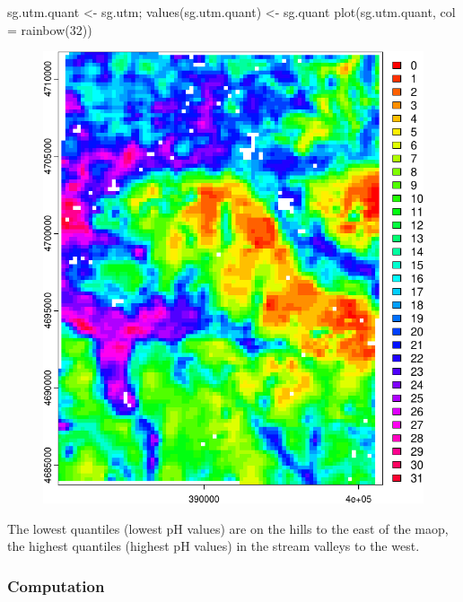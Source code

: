 \documentclass[
  letterpaper,
  DIV=11,
  numbers=noendperiod]{scrartcl}
\newenvironment{Shaded}{\begin{snugshade}}{\end{snugshade}}
\newcommand{\AttributeTok}[1]{\textcolor[rgb]{0.40,0.45,0.13}{#1}}
\newcommand{\DecValTok}[1]{\textcolor[rgb]{0.68,0.00,0.00}{#1}}
\newcommand{\FunctionTok}[1]{\textcolor[rgb]{0.28,0.35,0.67}{#1}}
\newcommand{\NormalTok}[1]{\textcolor[rgb]{0.00,0.23,0.31}{#1}}
\newcommand{\OtherTok}[1]{\textcolor[rgb]{0.00,0.23,0.31}{#1}}
\begin{document}
\begin{Shaded}
\begin{Highlighting}[]
\NormalTok{sg.utm.quant }\OtherTok{\textless{}{-}}\NormalTok{ sg.utm; }\FunctionTok{values}\NormalTok{(sg.utm.quant) }\OtherTok{\textless{}{-}}\NormalTok{ sg.quant}
\FunctionTok{plot}\NormalTok{(sg.utm.quant, }\AttributeTok{col =} \FunctionTok{rainbow}\NormalTok{(}\DecValTok{32}\NormalTok{))}
\end{Highlighting}
\end{Shaded}

\begin{figure}[H]

{\centering \includegraphics{PatternAnalysisWorkshopTutorial_files/figure-pdf/cut.matrix-1.pdf}

}

\end{figure}

The lowest quantiles (lowest pH values) are on the hills to the east of
the maop, the highest quantiles (highest pH values) in the stream
valleys to the west.

\hypertarget{sec-glcm-comp}{%
\subsubsection{Computation}\label{sec-glcm-comp}}
\end{document}
